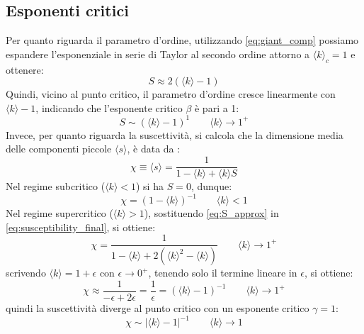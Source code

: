 \documentclass[12pt,italian]{article}
\begin{document}
\subsection{Esponenti critici} \label{sec:esponenti}
Per quanto riguarda il parametro d'ordine, utilizzando \eqref{eq:giant_comp} possiamo espandere l'esponenziale in serie di Taylor al secondo ordine attorno a $\langle k \rangle_c = 1$ e ottenere:
\begin{equation}
    S \approx 2(\langle k \rangle - 1)
    \label{eq:S_approx}
\end{equation}
Quindi, vicino al punto critico, il parametro d'ordine cresce linearmente con $\langle k \rangle - 1$, indicando che l'esponente critico $\beta$ è pari a 1:
\begin{equation}
    S \sim (\langle k \rangle - 1)^1 \quad\quad \langle k \rangle \to 1^+
\end{equation}
Invece, per quanto riguarda la suscettività, si calcola che la dimensione media delle componenti piccole $ \langle s \rangle$, è data da \cite{newman2018networks}:
\begin{equation}
    \chi \equiv \langle s \rangle = \frac{1}{1 - \langle k \rangle + \langle k \rangle S}
    \label{eq:susceptibility_final}
\end{equation}
Nel regime subcritico ($\langle k \rangle < 1$) si ha $S = 0$, dunque:
\begin{equation}
    \chi = (1- \langle k \rangle)^{-1} \quad\quad \langle k \rangle < 1
\end{equation}
Nel regime supercritico ($\langle k \rangle > 1$), sostituendo \eqref{eq:S_approx} in \eqref{eq:susceptibility_final}, si ottiene:
\begin{equation}
    \chi = \frac{1}{1 - \langle k \rangle + 2(\langle k \rangle^2 - \langle k \rangle)} \quad\quad  \langle k \rangle \to 1^+
\end{equation}
scrivendo $\langle k \rangle = 1 + \epsilon$ con $\epsilon \to 0^+$, tenendo solo il termine lineare in $\epsilon$, si ottiene:
\begin{equation}
    \chi \approx \frac{1}{- \epsilon + 2\epsilon} = \frac{1}{\epsilon} = ( \langle k \rangle - 1)^{-1} \quad\quad  \langle k \rangle \to 1^+
\end{equation}
quindi la suscettività diverge al punto critico con un esponente critico $\gamma = 1$:
\begin{equation}
    \chi \sim |\langle k \rangle - 1|^{-1} \quad\quad \langle k \rangle \to 1
\end{equation}


\printbibliography[heading=bibintoc, title={Bibliografia}]
\end{document}
